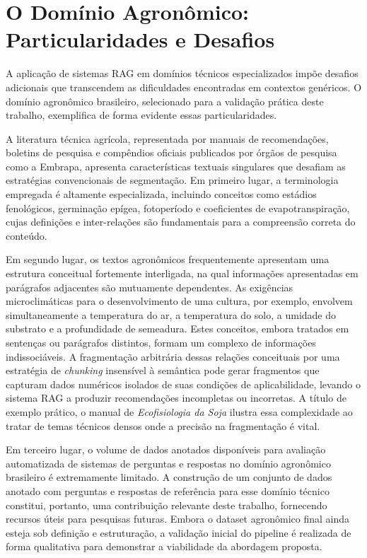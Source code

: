 \documentclass[
	12pt,				%
	openright,			%
	oneside,			%
	a4paper,			%
	tccpreliminar,		%
	]{ABNT-DC-UEL}
\begin{document}
\section{O Domínio Agronômico: Particularidades e Desafios}
\label{sec:agronomia}

A aplicação de sistemas RAG em domínios técnicos especializados impõe desafios adicionais que transcendem as dificuldades encontradas em contextos genéricos. O domínio agronômico brasileiro, selecionado para a validação prática deste trabalho, exemplifica de forma evidente essas particularidades.

A literatura técnica agrícola, representada por manuais de recomendações, boletins de pesquisa e compêndios oficiais publicados por órgãos de pesquisa como a Embrapa, apresenta características textuais singulares que desafiam as estratégias convencionais de segmentação. Em primeiro lugar, a terminologia empregada é altamente especializada, incluindo conceitos como estádios fenológicos, germinação epígea, fotoperíodo e coeficientes de evapotranspiração, cujas definições e inter-relações são fundamentais para a compreensão correta do conteúdo.

Em segundo lugar, os textos agronômicos frequentemente apresentam uma estrutura conceitual fortemente interligada, na qual informações apresentadas em parágrafos adjacentes são mutuamente dependentes. As exigências microclimáticas para o desenvolvimento de uma cultura, por exemplo, envolvem simultaneamente a temperatura do ar, a temperatura do solo, a umidade do substrato e a profundidade de semeadura. Estes conceitos, embora tratados em sentenças ou parágrafos distintos, formam um complexo de informações indissociáveis. A fragmentação arbitrária dessas relações conceituais por uma estratégia de \textit{chunking} insensível à semântica pode gerar fragmentos que capturam dados numéricos isolados de suas condições de aplicabilidade, levando o sistema RAG a produzir recomendações incompletas ou incorretas. A título de exemplo prático, o manual de \textit{Ecofisiologia da Soja} \cite{neumaier2020ecofisiologia} ilustra essa complexidade ao tratar de temas técnicos densos onde a precisão na fragmentação é vital.

Em terceiro lugar, o volume de dados anotados disponíveis para avaliação automatizada de sistemas de perguntas e respostas no domínio agronômico brasileiro é extremamente limitado. A construção de um conjunto de dados anotado com perguntas e respostas de referência para esse domínio técnico constitui, portanto, uma contribuição relevante deste trabalho, fornecendo recursos úteis para pesquisas futuras. Embora o dataset agronômico final ainda esteja sob definição e estruturação, a validação inicial do pipeline é realizada de forma qualitativa para demonstrar a viabilidade da abordagem proposta.
\end{document}
